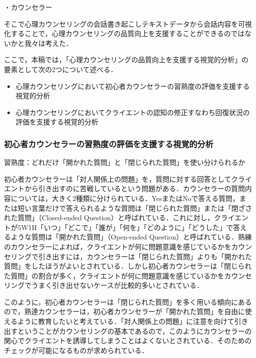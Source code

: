 \documentclass[shuuron]{kuee}
\begin{document}
・カウンセラー

そこで心理カウンセリングの会話書き起こしテキストデータから会話内容を可視化することで，心理カウンセリングの品質向上を支援することができるのではないかと我々は考えた．

ここで，本稿では，「心理カウンセリングの品質向上を支援する視覚的分析」の要素として次の2つについて述べる．
\begin{itemize}
\item 心理カウンセリングにおいて初心者カウンセラーの習熟度の評価を支援する視覚的分析
\item 心理カウンセリングにおいてクライエントの認知の修正すなわち回復状況の評価を支援する視覚的分析
\end{itemize}




\subsubsection{初心者カウンセラーの習熟度の評価を支援する視覚的分析}


習熟度：どれだけ「開かれた質問」と「閉じられた質問」を使い分けられるか

初心者カウンセラーは「対人関係上の問題」を，質問に対する回答としてクライエントから引き出すのに苦戦しているという問題がある．カウンセラーの質問内容については，大きく2種類に分けられている．YesまたはNoで答える質問，または短い言葉だけで答えられるような質問は「閉じられた質問」または「閉ざされた質問」（Closed-ended Question）と呼ばれている．これに対し，クライエントが5W1H「いつ」「どこで」「誰が」「何を」「どのように」「どうした」で答えるような質問は「開かれた質問」（Open-ended Question）と呼ばれている．熟練のカウンセラーによれば，クライエントが何に問題意識を感じているかをカウンセリングで引き出すには，カウンセラーは「閉じられた質問」よりも「開かれた質問」をしたほうがよいとされている\cite{ivey}．しかし初心者カウンセラーは「閉じられた質問」の割合が多く，クライエントが何に問題意識を感じているかをカウンセリングでうまく引き出せないケースが比較的多いとされている．

このように，初心者カウンセラーは「閉じられた質問」を多く用いる傾向にあるので，熟達カウンセラーは，初心者カウンセラーが「開かれた質問」を自由に使えるように教育したいと考えている．「対人関係上の問題」に注意を向けて引き出すということがカウンセリングの基本であるので，このようにカウンセラーの関心でクライエントを誘導してしまうことはよくないとされている．そのためのチェックが可能になるものが求められている．
\end{document}

